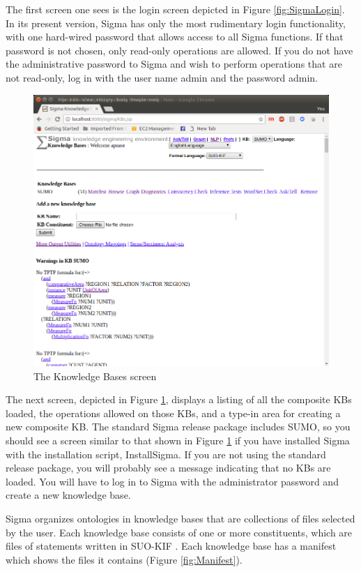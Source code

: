 \documentclass{book}
\begin{document}
The first screen one sees is the login screen depicted in Figure
\ref{fig:SigmaLogin}.  In its present version, Sigma has only the most
rudimentary login functionality, with one hard-wired password that allows access
to all Sigma functions.  If that password is not chosen, only read-only
operations are allowed.  If you do not have the administrative password to Sigma
and wish to perform operations that are not read-only, log in with the user name
admin and the password admin.

\begin{figure}
  \centering
  \includegraphics[width=4.5in]{pictures/SigmaKBs.png}
  \caption{The Knowledge Bases screen}
  \label{fig:SigmaKBs}
\end{figure}

The next screen, depicted in Figure \ref{fig:SigmaKBs}, displays a listing of
all the composite KBs loaded, the operations allowed on those KBs, and a type-in
area for creating a new composite KB.  The standard Sigma release package
includes SUMO, so you should see a screen similar to that shown in Figure
\ref{fig:SigmaKBs} if you have installed Sigma with the installation script,
InstallSigma.  If you are not using the standard release
package, you will probably see a message indicating that no KBs are loaded.  You
will have to log in to Sigma with the administrator password and create a new
knowledge base.

Sigma organizes ontologies in knowledge bases that are collections of files
selected by the user.  Each knowledge base consists of one or more constituents,
which are files of statements written in SUO-KIF \cite{Pease2009}.  Each
knowledge base has a manifest which shows the files it contains (Figure
\ref{fig:Manifest}).
\end{document}
